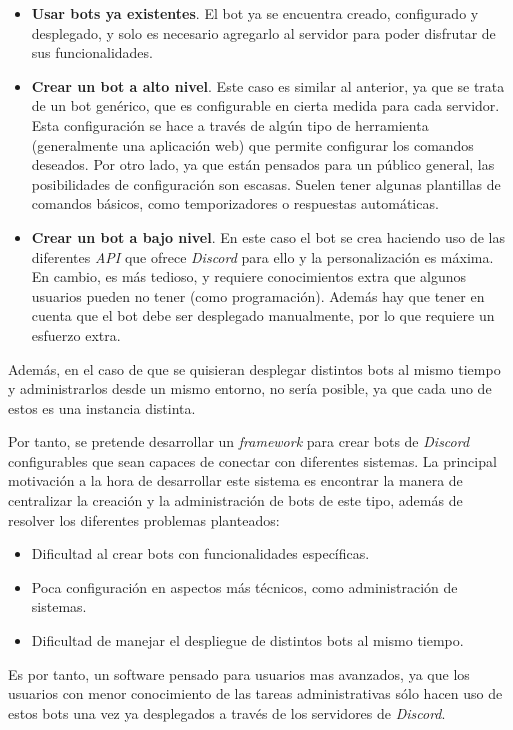 \begin{itemize}
	\item \textbf{Usar bots ya existentes}. El bot ya se encuentra creado, configurado y desplegado, y solo es necesario agregarlo al servidor para poder disfrutar de sus funcionalidades.
	\item \textbf{Crear un bot a alto nivel}. Este caso es similar al anterior, ya que se trata de un bot genérico, que es configurable en cierta medida para cada servidor. Esta configuración se hace a través de algún tipo de herramienta (generalmente una aplicación web) que permite configurar los comandos deseados. Por otro lado, ya que están pensados para un público general, las posibilidades de configuración son escasas. Suelen tener algunas plantillas de comandos básicos, como temporizadores o respuestas automáticas.
	\item \textbf{Crear un bot a bajo nivel}. En este caso el bot se crea haciendo uso de las diferentes \textit{API} que ofrece \textit{Discord} para ello y la personalización es máxima. En cambio, es más tedioso, y requiere conocimientos extra que algunos usuarios pueden no tener (como programación). Además hay que tener en cuenta que el bot debe ser desplegado manualmente, por lo que requiere un esfuerzo extra.
\end{itemize}

Además, en el caso de que se quisieran desplegar distintos bots al mismo tiempo y administrarlos desde un mismo entorno, no sería posible, ya que cada uno de estos es una instancia distinta.

Por tanto, se pretende desarrollar un \textit{framework} para crear bots de \textit{Discord} configurables que sean capaces de conectar con diferentes sistemas. La principal motivación a la hora de desarrollar este sistema es encontrar la manera de centralizar la creación y la administración de bots de este tipo, además de resolver los diferentes problemas planteados:

\begin{itemize}
	\item Dificultad al crear bots con funcionalidades específicas.
	\item Poca configuración en aspectos más técnicos, como administración de sistemas.
	\item Dificultad de manejar el despliegue de distintos bots al mismo tiempo.
\end{itemize}

Es por tanto, un software pensado para usuarios mas avanzados, ya que los usuarios con menor conocimiento de las tareas administrativas sólo hacen uso de estos bots una vez ya desplegados a través de los servidores de \textit{Discord}.
